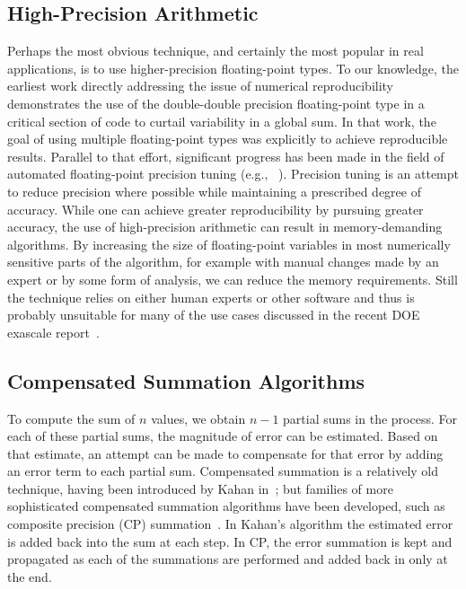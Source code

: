 \subsection{High-Precision Arithmetic}

Perhaps the most obvious technique, and certainly the most popular in
real applications, is to use higher-precision floating-point types. To
our knowledge, the earliest work directly addressing the issue of
numerical reproducibility~\cite{he} demonstrates the use of the
double-double precision floating-point type in a critical section of
code to curtail variability in a global sum. In that work, the goal of
using multiple floating-point types was explicitly to achieve
reproducible results. Parallel to that effort, significant progress
has been made in the field of automated floating-point precision
tuning (e.g., ~\cite{precimonious}). Precision tuning is an attempt
to reduce precision where possible while maintaining a prescribed
degree of accuracy.  While one can achieve greater
reproducibility by pursuing greater accuracy, the use of
high-precision arithmetic can result in memory-demanding
algorithms. By increasing the size of floating-point variables in most
numerically sensitive parts of the algorithm, for example with manual
changes made by an expert or by some form of analysis, we can reduce
the memory requirements. Still the technique relies on either human
experts or other software and thus is probably unsuitable for many 
of the use cases discussed in the recent DOE exascale
report~\cite{Doe2014}.

\subsection{Compensated Summation Algorithms}

To compute the sum of $n$ values, we obtain $n-1$ partial sums in the
process. For each of these partial sums, the magnitude of error can be
estimated.  Based on that estimate, an attempt can be made to
compensate for that error by adding an error term to each partial
sum. Compensated summation is a relatively old technique, having been
introduced by Kahan in~\cite{kahan65}; but families of more
sophisticated compensated summation algorithms have been developed,
such as composite precision (CP) summation~\cite{Taufer2010}. In
Kahan's algorithm the estimated error is added back into the sum at
each step. In CP, the error summation is kept and propagated as each
of the summations are performed and added back in only at the end.

